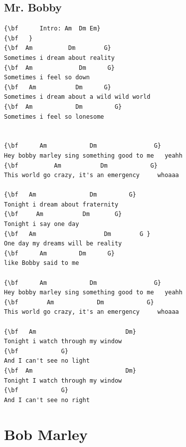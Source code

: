 \documentclass[a4paper]{article}
\begin{document}
\subsection{Mr. Bobby}
\begin{Verbatim}[commandchars=\\\{\}]
{\bf      Intro: Am  Dm Em}
{\bf   }
{\bf  Am          Dm        G}
Sometimes i dream about reality
{\bf  Am             Dm      G}
Sometimes i feel so down
{\bf   Am           Dm      G}
Sometimes i dream about a wild wild world
{\bf  Am            Dm         G}
Sometimes i feel so lonesome


{\bf      Am            Dm                G}
Hey bobby marley sing something good to me   yeahh
{\bf          Am           Dm            G}
This world go crazy, it's an emergency     whoaaa

{\bf   Am               Dm         G}
Tonight i dream about fraternity
{\bf     Am           Dm       G}
Tonight i say one day
{\bf   Am                   Dm        G }
One day my dreams will be reality
{\bf      Am         Dm      G}
like Bobby said to me

{\bf      Am            Dm                G}
Hey bobby marley sing something good to me   yeahh
{\bf        Am            Dm            G}
This world go crazy, it's an emergency     whoaaa

{\bf   Am                         Dm}
Tonight i watch through my window
{\bf            G}
And I can't see no light
{\bf  Am                          Dm}
Tonight I watch through my window
{\bf            G}
And I can't see no right

\end{Verbatim}
\newpage
\section{Bob Marley}
\end{document}

